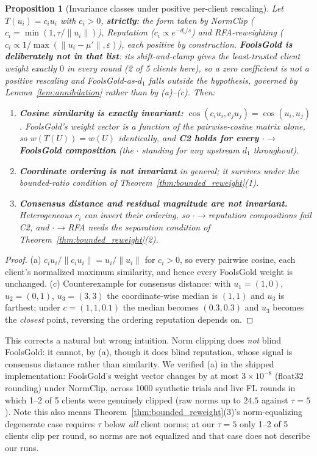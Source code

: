\documentclass{article}
\newtheorem{proposition}[theorem]{Proposition}
\begin{document}
\begin{proposition}[Invariance classes under positive per-client rescaling]
\label{prop:invariance}
Let $T(u_i) = c_i u_i$ with $c_i > 0$, \textbf{strictly}: the form taken by NormClip ($c_i = \min(1, \tau/\|u_i\|)$), Reputation ($c_i \propto e^{-d_i/s}$) and RFA-reweighting ($c_i \propto 1/\max(\|u_i - \mu'\|, \varepsilon)$), each positive by construction. \textbf{FoolsGold is deliberately not in that list}: its shift-and-clamp gives the least-trusted client weight exactly $0$ in \emph{every} round (2 of 5 clients here), so a zero coefficient is not a \emph{positive} rescaling and FoolsGold-as-$d_1$ falls outside the hypothesis, governed by Lemma~\ref{lem:annihilation} rather than by (a)--(c). Then:
\begin{enumerate}[noitemsep,topsep=2pt,label=(\alph*)]
\item \textbf{Cosine similarity is exactly invariant:} $\cos(c_iu_i, c_ju_j) = \cos(u_i,u_j)$. FoolsGold's weight vector is a function of the pairwise-cosine matrix alone, so $w(T(U)) = w(U)$ identically, and \textbf{C2 holds for every $\cdot{\to}$FoolsGold composition} (the $\cdot$ standing for any upstream $d_1$ throughout).
\item \textbf{Coordinate ordering is not invariant} in general; it survives under the bounded-ratio condition of Theorem~\ref{thm:bounded_reweight}(1).
\item \textbf{Consensus distance and residual magnitude are not invariant.} Heterogeneous $c_i$ can invert their ordering, so $\cdot{\to}$reputation compositions fail C2, and $\cdot{\to}$RFA needs the separation condition of Theorem~\ref{thm:bounded_reweight}(2).
\end{enumerate}
\end{proposition}
\begin{proof}
(a) $c_iu_i/\|c_iu_i\| = u_i/\|u_i\|$ for $c_i>0$, so every pairwise cosine, each client's normalized maximum similarity, and hence every FoolsGold weight is unchanged. (c) Counterexample for consensus distance: with $u_1{=}(1,0)$, $u_2{=}(0,1)$, $u_3{=}(3,3)$ the coordinate-wise median is $(1,1)$ and $u_3$ is farthest; under $c=(1,1,0.1)$ the median becomes $(0.3,0.3)$ and $u_3$ becomes the \emph{closest} point, reversing the ordering reputation depends on.
\end{proof}

\noindent This corrects a natural but wrong intuition. Norm clipping does \emph{not} blind FoolsGold: it cannot, by (a), though it does blind reputation, whose signal is consensus distance rather than similarity. We verified (a) in the shipped implementation: FoolsGold's weight vector changes by at most $3\times10^{-8}$ (float32 rounding) under NormClip, across 1000 synthetic trials and live FL rounds in which 1--2 of 5 clients were genuinely clipped (raw norms up to $24.5$ against $\tau{=}5$). Note this also means Theorem~\ref{thm:bounded_reweight}(3)'s norm-equalizing degenerate case requires $\tau$ below \emph{all} client norms; at our $\tau{=}5$ only 1--2 of 5 clients clip per round, so norms are not equalized and that case does not describe our runs.
\end{document}
